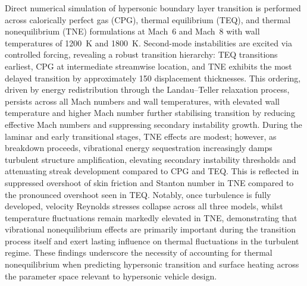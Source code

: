Direct numerical simulation of hypersonic boundary layer transition is performed across calorically perfect gas (CPG), thermal equilibrium (TEQ), and thermal nonequilibrium (TNE) formulations at Mach~6 and Mach~8 with wall temperatures of 1200~K and 1800~K. Second-mode instabilities are excited via controlled forcing, revealing a robust transition hierarchy: TEQ transitions earliest, CPG at intermediate streamwise location, and TNE exhibits the most delayed transition by approximately 150 displacement thicknesses. This ordering, driven by energy redistribution through the Landau--Teller relaxation process, persists across all Mach numbers and wall temperatures, with elevated wall temperature and higher Mach number further stabilising transition by reducing effective Mach numbers and suppressing secondary instability growth. During the laminar and early transitional stages, TNE effects are modest; however, as breakdown proceeds, vibrational energy sequestration increasingly damps turbulent structure amplification, elevating secondary instability thresholds and attenuating streak development compared to CPG and TEQ. This is reflected in suppressed overshoot of skin friction and Stanton number in TNE compared to the pronounced overshoot seen in TEQ. Notably, once turbulence is fully developed, velocity Reynolds stresses collapse across all three models, whilst temperature fluctuations remain markedly elevated in TNE, demonstrating that vibrational nonequilibrium effects are primarily important during the transition process itself and exert lasting influence on thermal fluctuations in the turbulent regime. These findings underscore the necessity of accounting for thermal nonequilibrium when predicting hypersonic transition and surface heating across the parameter space relevant to hypersonic vehicle design.

